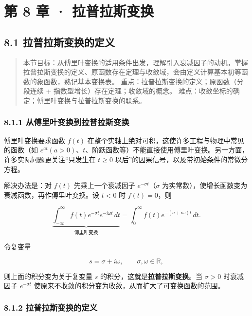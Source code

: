 \chapter{第 8 章 ·
拉普拉斯变换}\label{ux7b2c-8-ux7ae0-ux62c9ux666eux62c9ux65afux53d8ux6362}

\section{8.1
拉普拉斯变换的定义}\label{ux62c9ux666eux62c9ux65afux53d8ux6362ux7684ux5b9aux4e49}

\begin{quote}
本节目标：从傅里叶变换的适用条件出发，理解引入衰减因子的动机，掌握拉普拉斯变换的定义、原函数存在定理与收敛域，会由定义计算基本初等函数的象函数，熟记基本变换表。
重点：拉普拉斯变换的定义；原函数（分段连续 +
指数型增长）存在定理；收敛域的概念。
难点：收敛坐标的确定；傅里叶变换与拉普拉斯变换的联系。
\end{quote}

\subsection{8.1.1
从傅里叶变换到拉普拉斯变换}\label{ux4eceux5085ux91ccux53f6ux53d8ux6362ux5230ux62c9ux666eux62c9ux65afux53d8ux6362}

傅里叶变换要求函数 \(f(t)\)
在整个实轴上绝对可积，这使许多工程与物理中常见的函数（如
\(e^{at} (a>0)\)、\(t\)、阶跃函数等）不能直接使用傅里叶变换。另一方面，许多实际问题更关注``只发生在
\(t\ge 0\) 以后''的因果信号，以及带初始条件的常微分方程。

解决办法是：对 \(f(t)\) 先乘上一个衰减因子 \(e^{-\sigma t}\)（\(\sigma\)
为实常数），使增长函数变为衰减函数，再作傅里叶变换。设 \(t<0\) 时
\(f(t)=0\)，则

\[
\underbrace{\int_{-\infty}^{\infty} f(t)e^{-\sigma t}e^{-i\omega t}\,dt}_{\text{傅里叶变换}}
= \int_{0}^{\infty} f(t)e^{-(\sigma+i\omega)t}\,dt .
\]

令复变量

\[
s = \sigma + i\omega,\qquad \sigma,\omega \in \mathbb{R},
\]

则上面的积分变为关于复变量 \(s\) 的积分，这就是\textbf{拉普拉斯变换}。当
\(\sigma>0\) 时衰减因子 \(e^{-\sigma t}\)
使原来不收敛的积分变为收敛，从而扩大了可变换函数的范围。

\subsection{8.1.2
拉普拉斯变换的定义}\label{ux62c9ux666eux62c9ux65afux53d8ux6362ux7684ux5b9aux4e49-1}

